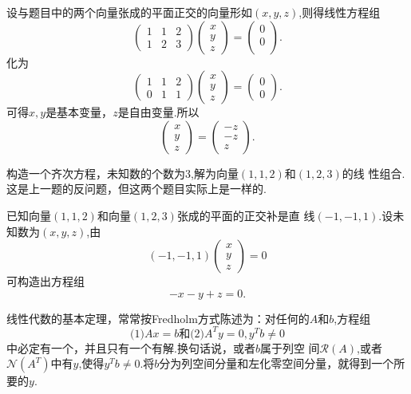 ﻿\documentclass{book} \usepackage{exsheets} \usepackage{xeCJK}
\begin{document}
\begin{solution}
  设与题目中的两个向量张成的平面正交的向量形如$(x,y,z)$,则得线性方程组
$$
\begin{pmatrix}
  1&1&2\\
  1&2&3
\end{pmatrix}
\begin{pmatrix}
  x\\
  y\\
  z
\end{pmatrix}=
\begin{pmatrix}
  0\\
  0\\
\end{pmatrix}.
$$
化为
$$
\begin{pmatrix}
  1&1&2\\
  0&1&1
\end{pmatrix}
\begin{pmatrix}
  x\\
  y\\
  z
\end{pmatrix}=
\begin{pmatrix}
  0\\
  0
\end{pmatrix}.
$$
可得$x,y$是基本变量，$z$是自由变量.所以
$$
\begin{pmatrix}
  x\\
  y\\
  z
\end{pmatrix}=
\begin{pmatrix}
  -z\\
  -z\\
  z
\end{pmatrix}.
$$
\end{solution}
\begin{question}
  构造一个齐次方程，未知数的个数为$3$,解为向量$(1,1,2)$和$(1,2,3)$的线
  性组合.这是上一题的反问题，但这两个题目实际上是一样的.
\end{question}
\begin{solution}
  已知向量$(1,1,2)$和向量$(1,2,3)$张成的平面的正交补是直
  线$(-1,-1,1)$.设未知数为$(x,y,z)$,由
$$
(-1,-1,1)
\begin{pmatrix}
  x\\
  y\\
  z
\end{pmatrix}=0
$$
可构造出方程组
$$
-x-y+z=0.
$$
\end{solution}
\begin{question}
  线性代数的基本定理，常常按Fredholm方式陈述为：对任何的$A$和$b$,方程组
$$\mbox{(1)}Ax=b\mbox{和(2)}A^Ty=0,y^Tb\neq 0$$
中必定有一个，并且只有一个有解.换句话说，或者$b$属于列空
间$\mathcal{R}(A)$,或者$\mathcal{N}(A^T)$中有$y$,使得$y^Tb\neq
0$.将$b$分为列空间分量和左化零空间分量，就得到一个所要的$y$.
\end{question}
\end{document}
